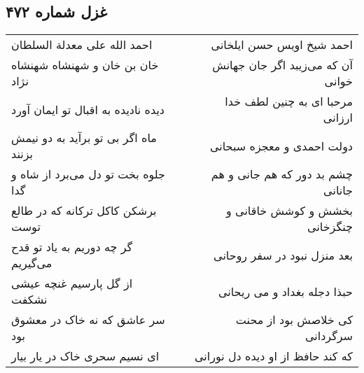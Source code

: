 \begin{center}
\section*{غزل شماره ۴۷۲}
\label{sec:sh472}
\begin{longtable}{l p{0.5cm} r}
احمد الله علی معدلة السلطان
&&
احمد شیخ اویس حسن ایلخانی
\\
خان بن خان و شهنشاه شهنشاه نژاد
&&
آن که می‌زیبد اگر جان جهانش خوانی
\\
دیده نادیده به اقبال تو ایمان آورد
&&
مرحبا ای به چنین لطف خدا ارزانی
\\
ماه اگر بی تو برآید به دو نیمش بزنند
&&
دولت احمدی و معجزه سبحانی
\\
جلوه بخت تو دل می‌برد از شاه و گدا
&&
چشم بد دور که هم جانی و هم جانانی
\\
برشکن کاکل ترکانه که در طالع توست
&&
بخشش و کوشش خاقانی و چنگزخانی
\\
گر چه دوریم به یاد تو قدح می‌گیریم
&&
بعد منزل نبود در سفر روحانی
\\
از گل پارسیم غنچه عیشی نشکفت
&&
حبذا دجله بغداد و می ریحانی
\\
سر عاشق که نه خاک در معشوق بود
&&
کی خلاصش بود از محنت سرگردانی
\\
ای نسیم سحری خاک در یار بیار
&&
که کند حافظ از او دیده دل نورانی
\\
\end{longtable}
\end{center}
